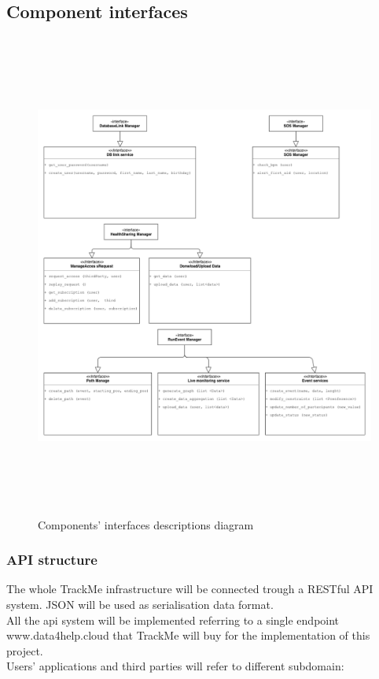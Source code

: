 \documentclass[DD.tex]{subfiles}
\begin{document}
\subsection{Component interfaces}
\begin{figure}[!th]
	\centering
	\includegraphics[height=16.00cm,keepaspectratio]{Figures/Interfaces}
	\caption{Components' interfaces descriptions diagram}
\end{figure}

\newpage

\subsubsection{API structure}
The whole TrackMe infrastructure will be connected trough a RESTful API system. JSON will be used as serialisation data format.\\
All the api system will be implemented referring to a single endpoint www.data4help.cloud that TrackMe will buy for the implementation of this project.
\\Users' applications and third parties will refer to different subdomain:
\end{document}

